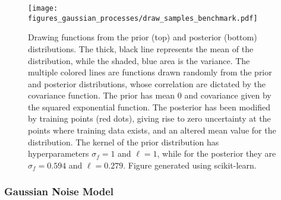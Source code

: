 \documentclass[twoside,english]{uiofysmaster}
\begin{document}
\begin{figure}
\centering
\texttt{[image: figures\_gaussian\_processes/draw\_samples\_benchmark.pdf]}
\caption{Drawing functions from the prior (top) and posterior (bottom) distributions. The thick, black line represents the mean of the distribution, while the shaded, blue area is the variance. The multiple colored lines are functions drawn randomly from the prior and posterior distributions, whose correlation are dictated by the covariance function. The prior has mean 0 and covariance given by the squared exponential function. The posterior has been modified by training points (red dots), giving rise to zero uncertainty at the points where training data exists, and an altered mean value for the distribution. The kernel of the prior distribution has hyperparameters $\sigma_f = 1$ and $\ell = 1$, while for the posterior they are $\sigma_f = 0.594$ and $\ell = 0.279$. Figure generated using scikit-learn.}
\label{Fig:: gaussian process : prior posterior drawn samples}
\end{figure}

\subsubsection{Gaussian Noise Model}\label{Sec: gaussian process : Gaussian Noise Model}
\end{document}
